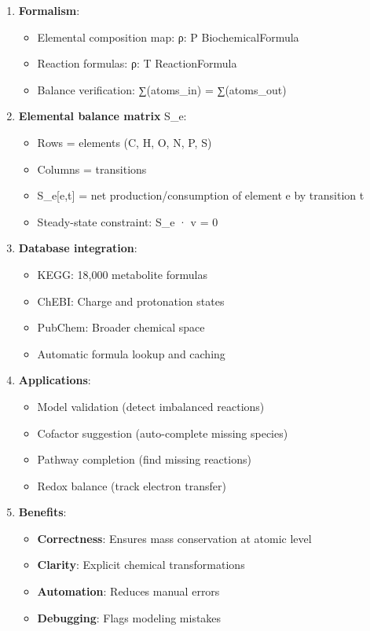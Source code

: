 \begin{enumerate}
\def\labelenumi{\arabic{enumi}.}
\tightlist
\item
  \textbf{Formalism}:

  \begin{itemize}
  \tightlist
  \item
    Elemental composition map: ρ: P \textrightarrow BiochemicalFormula
  \item
    Reaction formulas: ρ: T \textrightarrow ReactionFormula
  \item
    Balance verification: ∑(atoms\_in) = ∑(atoms\_out)
  \end{itemize}
\item
  \textbf{Elemental balance matrix} S\_e:

  \begin{itemize}
  \tightlist
  \item
    Rows = elements (C, H, O, N, P, S)
  \item
    Columns = transitions
  \item
    S\_e{[}e,t{]} = net production/consumption of element e by
    transition t
  \item
    Steady-state constraint: S\_e · v = 0
  \end{itemize}
\item
  \textbf{Database integration}:

  \begin{itemize}
  \tightlist
  \item
    KEGG: 18,000 metabolite formulas
  \item
    ChEBI: Charge and protonation states
  \item
    PubChem: Broader chemical space
  \item
    Automatic formula lookup and caching
  \end{itemize}
\item
  \textbf{Applications}:

  \begin{itemize}
  \tightlist
  \item
    Model validation (detect imbalanced reactions)
  \item
    Cofactor suggestion (auto-complete missing species)
  \item
    Pathway completion (find missing reactions)
  \item
    Redox balance (track electron transfer)
  \end{itemize}
\item
  \textbf{Benefits}:

  \begin{itemize}
  \tightlist
  \item
    \checkmark \textbf{Correctness}: Ensures mass conservation at atomic level
  \item
    \checkmark \textbf{Clarity}: Explicit chemical transformations
  \item
    \checkmark \textbf{Automation}: Reduces manual errors
  \item
    \checkmark \textbf{Debugging}: Flags modeling mistakes
  \end{itemize}
\end{enumerate}


